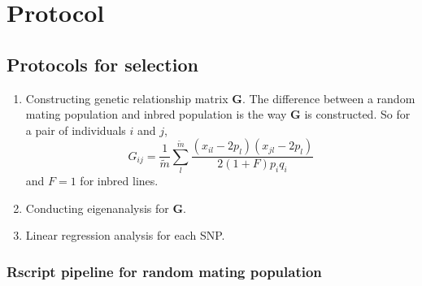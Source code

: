 \documentclass[]{book}
\begin{document}
\hypertarget{protocol}{%
\chapter{Protocol}\label{protocol}}

\hypertarget{protocols-for-selection}{%
\section{Protocols for selection}\label{protocols-for-selection}}

\begin{enumerate}
\def\labelenumi{\arabic{enumi}.}
\item
  Constructing genetic relationship matrix \(\mathbf{G}\). The
  difference between a random mating population and inbred population is
  the way \(\mathbf{G}\) is constructed. So for a pair of individuals
  \(i\) and \(j\),
  \[G_{ij}=\frac{1}{\tilde{m}}\sum_l^{\tilde{m}}\frac{(x_{il}-2p_l)(x_{jl}-2p_l)}{2(1+F)p_iq_i}\]
  and \(F=1\) for inbred lines.
\item
  Conducting eigenanalysis for \(\mathbf{G}\).
\item
  Linear regression analysis for each SNP.
\end{enumerate}

\hypertarget{rscript-pipeline-for-random-mating-population}{%
\subsection{Rscript pipeline for random mating
population}\label{rscript-pipeline-for-random-mating-population}}
\end{document}
